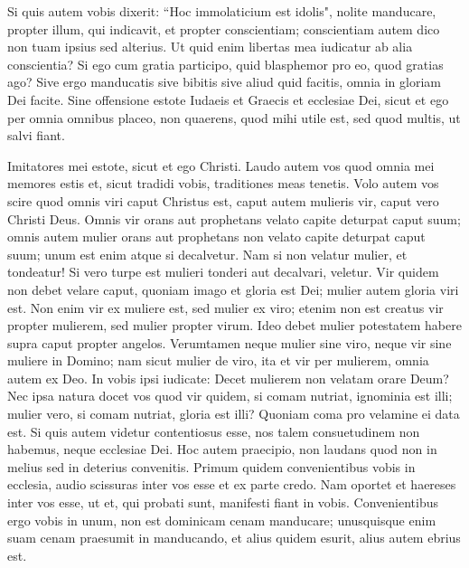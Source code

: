 \begin{biblechapter}
\verse Si quis autem vobis dixerit: “Hoc immolaticium est idolis", nolite manducare, propter illum, qui indicavit, et propter conscientiam; 
\verse conscientiam autem dico non tuam ipsius sed alterius. Ut quid enim libertas mea iudicatur ab alia conscientia?  
\verse Si ego cum gratia participo, quid blasphemor pro eo, quod gratias ago? 
\verse Sive ergo manducatis sive bibitis sive aliud quid facitis, omnia in gloriam Dei facite. 
\verse Sine offensione estote Iudaeis et Graecis et ecclesiae Dei,  
\verse sicut et ego per omnia omnibus placeo, non quaerens, quod mihi utile est, sed quod multis, ut salvi fiant. 
\end{biblechapter}

\begin{biblechapter} 
\verse Imitatores mei estote, sicut et ego Christi. 
\verse Laudo autem vos quod omnia mei memores estis et, sicut tradidi vobis, traditiones meas tenetis. 
\verse Volo autem vos scire quod omnis viri caput Christus est, caput autem mulieris vir, caput vero Christi Deus. 
\verse Omnis vir orans aut prophetans velato capite deturpat caput suum; 
\verse omnis autem mulier orans aut prophetans non velato capite deturpat caput suum; unum est enim atque si decalvetur. 
\verse Nam si non velatur mulier, et tondeatur! Si vero turpe est mulieri tonderi aut decalvari, veletur. 
\verse Vir quidem non debet velare caput, quoniam imago et gloria est Dei; mulier autem gloria viri est. 
\verse Non enim vir ex muliere est, sed mulier ex viro;  
\verse etenim non est creatus vir propter mulierem, sed mulier propter virum. 
\verse Ideo debet mulier potestatem habere supra caput propter angelos. 
\verse Verumtamen neque mulier sine viro, neque vir sine muliere in Domino; 
\verse nam sicut mulier de viro, ita et vir per mulierem, omnia autem ex Deo. 
\verse In vobis ipsi iudicate: Decet mulierem non velatam orare Deum? 
\verse Nec ipsa natura docet vos quod vir quidem, si comam nutriat, ignominia est illi; 
\verse mulier vero, si comam nutriat, gloria est illi? Quoniam coma pro velamine ei data est. 
\verse Si quis autem videtur contentiosus esse, nos talem consuetudinem non habemus, neque ecclesiae Dei. 
\verse Hoc autem praecipio, non laudans quod non in melius sed in deterius convenitis. 
\verse Primum quidem convenientibus vobis in ecclesia, audio scissuras inter vos esse et ex parte credo. 
\verse Nam oportet et haereses inter vos esse, ut et, qui probati sunt, manifesti fiant in vobis. 
\verse Convenientibus ergo vobis in unum, non est dominicam cenam manducare; 
\verse unusquisque enim suam cenam praesumit in manducando, et alius quidem esurit, alius autem ebrius est. 

\end{biblechapter}
